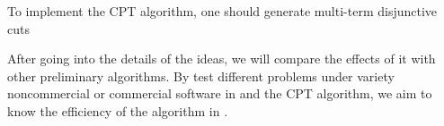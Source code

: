 \documentclass[a4paper,10pt]{article}
\begin{document}
To implement the CPT algorithm, one should generate multi-term disjunctive cuts 

After going into the details of the ideas, we will compare the effects of it with other preliminary algorithms. By test different problems under variety 
noncommercial or commercial software in \cite{soft05} and the CPT algorithm, we aim to know the efficiency of the algorithm in \cite{cpt11}. 

 

 
\end{document}
